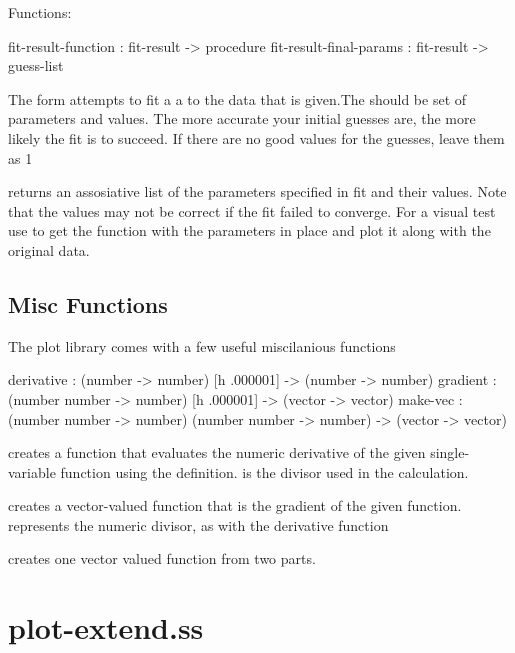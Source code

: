 \documentclass{article}
\begin{document}
{\begin{schemedisplay}
Functions:

  fit-result-function : fit-result -> procedure
  fit-result-final-params : fit-result -> guess-list

\end{schemedisplay}



The  form attempts to fit a a  to the data that is given.The should be set of parameters and values. The more accurate  your initial guesses are, the more likely the fit is to succeed. If there are no good values for the guesses, leave them as 1


 returns an assosiative list of the parameters specified  in fit
 and their values. Note that the values may not be correct if the fit failed to converge. 
For a visual test use  to get the function with the parameters 
in place and plot it along with the original data.

\subsection{Misc Functions}


The plot library comes with a few useful miscilanious functions


\begin{schemedisplay}

derivative      : (number -> number) [h .000001] -> (number -> number)   
gradient : (number number -> number) [h .000001] -> (vector -> vector)
make-vec : (number number -> number) (number number -> number) -> (vector -> vector) 
\end{schemedisplay}

 creates a function that evaluates the numeric derivative of the given  single-variable function using the definition.  is the divisor used in the calculation.


 creates a vector-valued function that is the gradient of the given function. represents the numeric divisor, as with the derivative function


 creates one vector valued function from two parts.

\pagebreak


\label{plot-extend.ss}
\section{plot-extend.ss}



}
\end{document}
